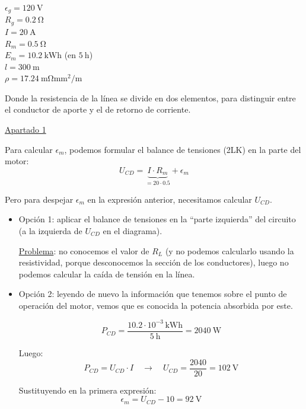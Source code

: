 \begin{example}
\begin{minipage}{0.3\linewidth}
  $\epsilon_g = \qty{120}{\volt}$\\
  $R_g = \qty{0.2}{\ohm}$\\
  $I = \qty{20}{\ampere}$\\
  $R_m = \qty{0.5}{\ohm}$\\
  $E_m = \qty{10.2}{\kWh}$ (en $\qty{5}{\hour}$)\\
  $l = \qty{300}{\meter}$\\
  $\rho = \qty{17.24}{\milli\ohm\milli\meter\squared\per\meter}$
\end{minipage}

\vspace{6mm}

Donde la resistencia de la línea se divide en dos elementos, para
distinguir entre el conductor de aporte y el de retorno de corriente.

\vspace{6mm}

\underline{Apartado 1}

\vspace{4mm}

Para calcular $\epsilon_m$, podemos formular el balance de tensiones
(2LK) en la parte del motor:
\[
  U_{CD} = \underbrace{I \cdot R_m}_{= 20 \cdot 0.5} + \epsilon_m
\]

Pero para despejar $\epsilon_m$ en la expresión anterior, necesitamos
calcular $U_{CD}$.
\begin{itemize}
\item Opción 1: aplicar el balance de tensiones en la ``parte
  izquierda'' del circuito (a la izquierda de $U_{CD}$ en el
  diagrama).
    
  \underline{Problema}: no conocemos el valor de $R_L$ (y no podemos
  calcularlo usando la resistividad, porque desconocemos la sección de
  los conductores), luego no podemos calcular la caída de tensión en
  la línea.
    
\item Opción 2: leyendo de nuevo la información que tenemos sobre el
  punto de operación del motor, vemos que es conocida la potencia
  absorbida por este.

    \[
      P_{CD} = \frac{10.2 \cdot 10^{-3} \, \si{\kWh}}{\qty{5}{\hour}}
      = \qty{2040}{\watt}
    \]

    Luego:
    \[
      P_{CD} = U_{CD} \cdot I \quad \rightarrow \quad U_{CD} =
      \frac{2040}{20} = \qty{102}{\volt}
    \]

    Sustituyendo en la primera expresión:
    \[
      \epsilon_m = U_{CD} - 10 = \boxed{ \qty{92}{\volt} }
    \]


\end{itemize}
\end{example}
